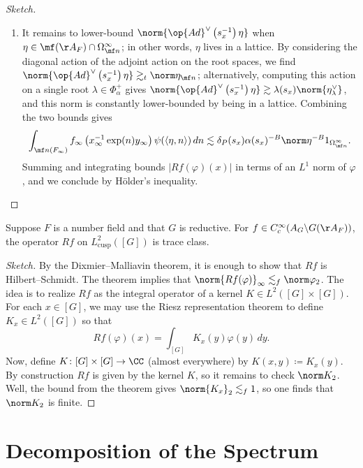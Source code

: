 \documentclass{article}
\begin{document}
\begin{proof}[Sketch]
\begin{enumerate}
		\item It remains to lower-bound $\norm{\op{Ad}^\lor\left(s_x^{-1}\right)\eta}$ when $\eta\in\mf(\AA_F)\cap\Omega_{\mf n}^\infty$; in other words, $\eta$ lives in a lattice. By considering the diagonal action of the adjoint action on the root spaces, we find $\norm{\op{Ad}^\lor\left(s_x^{-1}\right)\eta}\gtrsim_t\norm\eta_{\mf n}$; alternatively, computing this action on a single root $\lambda\in\Phi_\alpha^+$ gives $\norm{\op{Ad}^\lor\left(s_x^{-1}\right)\eta}\gtrsim\lambda(s_x)\norm{\eta_\lambda^\lor}$, and this norm is constantly lower-bounded by being in a lattice. Combining the two bounds gives
		\[\int_{\mf n(F_\infty)}f_\infty\left(x_\infty^{-1}\exp(n)y_\infty\right)\psi(\langle\eta,n\rangle)\,dn\lesssim\delta_P(s_x)\alpha(s_x)^{-B}\norm\eta^{-B}1_{\Omega_{\mf n}^\infty}.\]
		Summing and integrating bounds $\left|Rf(\varphi)(x)\right|$ in terms of an $L^1$ norm of $\varphi$, and we conclude by H\"older's inequality.
		\qedhere
	\end{enumerate}
\end{proof}
\begin{corollary}
	Suppose $F$ is a number field and that $G$ is reductive. For $f\in C_c^\infty(A_G\backslash G(\AA_F))$, the operator $Rf$ on $L^2_{\mathrm{cusp}}([G])$ is trace class.
\end{corollary}
\begin{proof}[Sketch]
	By the Dixmier--Malliavin theorem, it is enough to show that $Rf$ is Hilbert--Schmidt. The theorem implies that $\norm{Rf(\varphi)}_\infty\lesssim_f\norm\varphi_2$. The idea is to realize $Rf$ as the integral operator of a kernel $K\in L^2([G]\times[G])$. For each $x\in[G]$, we may use the Riesz representation theorem to define $K_x\in L^2([G])$ so that
	\[Rf(\varphi)(x)=\int_{[G]}K_x(y)\varphi(y)\,dy.\]
	Now, define $K\colon[G]\times[G]\to\CC$ (almost everywhere) by $K(x,y)\coloneqq K_x(y)$. By construction $Rf$ is given by the kernel $K$, so it remains to check $\norm K_2$. Well, the bound from the theorem gives $\norm{K_x}_2\lesssim_f1$, so one finds that $\norm K_2$ is finite.
\end{proof}

\section{Decomposition of the Spectrum}
\end{document}
